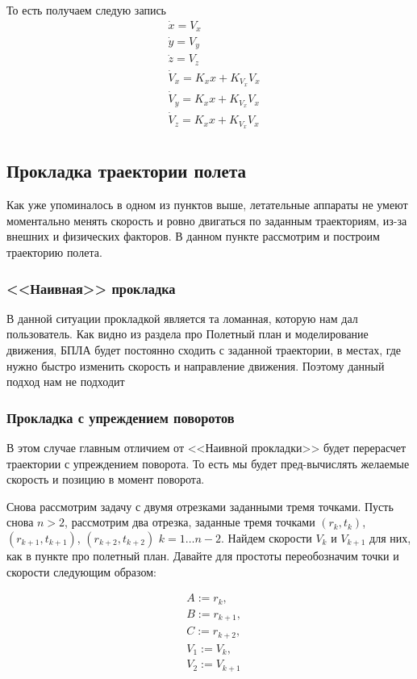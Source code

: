 \documentclass[a4paper,12pt]{article}
\begin{document}
То есть получаем следую запись
\begin{align*}
    &\dot{x} = V_x\\
    &\dot{y} = V_y\\
    &\dot{z} = V_z\\
    &\dot{V}_x = K_x x + K_{V_x} V_x\\
    &\dot{V}_y = K_x x + K_{V_x} V_x\\
    &\dot{V}_z = K_x x + K_{V_x} V_x\\
\end{align*}



\subsection{Прокладка траектории полета}
Как уже упоминалось в одном из пунктов выше, летательные аппараты не умеют моментально менять скорость и ровно двигаться по заданным траекториям, из-за внешних и физических факторов. В данном пункте рассмотрим и построим траекторию полета.

\subsubsection{<<Наивная>> прокладка}
В данной ситуации прокладкой является та ломанная, которую нам дал пользователь. Как видно из раздела про Полетный план и моделирование движения, БПЛА будет постоянно сходить с заданной траектории, в местах, где нужно быстро изменить скорость и направление движения. Поэтому данный подход нам не подходит


\subsubsection{Прокладка с упреждением поворотов}
В этом случае главным отличием от <<Наивной прокладки>> будет перерасчет траектории с упреждением поворота. То есть мы будет пред-вычислять желаемые скорость и позицию в момент поворота.

Снова рассмотрим задачу с двумя отрезками заданными тремя точками. Пусть снова $n>2$, рассмотрим два отрезка, заданные тремя точками $(r_k,t_k)$, $(r_{k+1},t_{k+1})$, $(r_{k+2},t_{k+2})$ $k=1\dots n-2$. Найдем скорости $V_k$ и $V_{k+1}$ для них, как в пункте про полетный план. Давайте для простоты переобозначим точки и скорости следующим образом:

\begin{align*}
    &A:=r_k, \\
    &B:=r_{k+1},\\ 
    &C:=r_{k+2},\\
    &V_1 := V_k, \\
    &V_2:= V_{k+1}\\
\end{align*}
\end{document}
